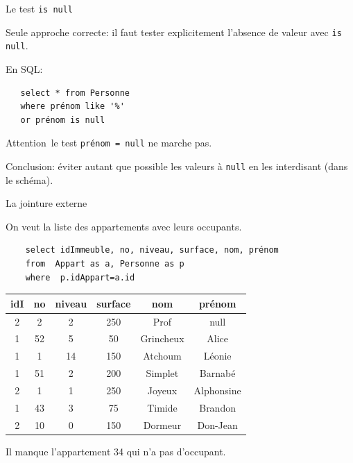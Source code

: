 \begin{frame}[fragile]{Le test \texttt{is null}}

Seule approche correcte: il faut tester explicitement l'absence de valeur avec \texttt{is null}.

\vfill
En SQL: 

\begin{verbatim}
   select * from Personne
   where prénom like '%' 
   or prénom is null
\end{verbatim}

\vfill

\alert{Attention}\, le test \texttt{prénom = null} \alert{ne marche pas}.

\vfill

\begin{blocgauche}
\alert{Conclusion}: éviter autant que possible les valeurs à \texttt{null}
en les interdisant (dans le schéma).
\end{blocgauche}
\end{frame}

\begin{frame}[fragile]{La jointure externe}

On veut la liste des appartements avec leurs occupants.
\vfill


\begin{verbatim}
    select idImmeuble, no, niveau, surface, nom, prénom
    from  Appart as a, Personne as p
    where  p.idAppart=a.id
\end{verbatim}

\vfill

\begin{tabular}{c|c|c|c|c|c}
\textbf{idI} & \textbf{no} & \textbf{niveau} & \textbf{surface} & \textbf{nom} & \textbf{prénom}\\ \hline 
2 & 2 & 2 & 250 & Prof & null\\ \hline 
1 & 52 & 5 & 50 & Grincheux & Alice\\ \hline 
1 & 1 & 14 & 150 & Atchoum & Léonie\\ \hline 
1 & 51 & 2 & 200 & Simplet & Barnabé\\ \hline 
2 & 1 & 1 & 250 & Joyeux & Alphonsine\\ \hline 
1 & 43 & 3 & 75 & Timide & Brandon\\ \hline 
2 & 10 & 0 & 150 & Dormeur & Don-Jean\\ \hline 
\end{tabular}

\vfill

\begin{blocgauche}
\alert{Il manque l'appartement 34 qui n'a pas d'occupant}.
\end{blocgauche}
\end{frame}

